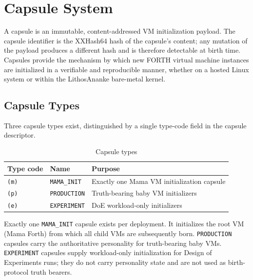 
\chapter{Capsule System}
\label{vol2:chap:capsules}

A capsule is an immutable, content-addressed VM initialization payload.
The capsule identifier is the XXHash64 hash of the capsule's content;
any mutation of the payload produces a different hash and is therefore
detectable at birth time. Capsules provide the mechanism by which new
FORTH virtual machine instances are initialized in a verifiable and
reproducible manner, whether on a hosted Linux system or within the
LithosAnanke bare-metal kernel.

\section{Capsule Types}
\label{vol2:sec:capsules:types}


Three capsule types exist, distinguished by a single type-code field
in the capsule descriptor.

\begin{table}[ht]
  \centering
  \caption{Capsule types}
  \label{tab:capsule-types}
  \begin{tabular}{lll}
    \toprule
    Type code & Name & Purpose \\
    \midrule
    \texttt{(m)} & \texttt{MAMA\_INIT} & Exactly one Mama VM initialization capsule \\
    \texttt{(p)} & \texttt{PRODUCTION} & Truth-bearing baby VM initializers \\
    \texttt{(e)} & \texttt{EXPERIMENT} & DoE workload-only initializers \\
    \bottomrule
  \end{tabular}
\end{table}

Exactly one \texttt{MAMA\_INIT} capsule exists per deployment. It initializes
the root VM (Mama Forth) from which all child VMs are subsequently born.
\texttt{PRODUCTION} capsules carry the authoritative personality for
truth-bearing baby VMs. \texttt{EXPERIMENT} capsules supply workload-only
initialization for Design of Experiments runs; they do not carry personality
state and are not used as birth-protocol truth bearers.

